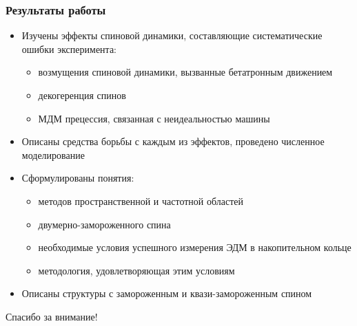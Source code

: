 \documentclass[14pt]{beamer}
\begin{document}
\begin{frame}
\frametitle{Результаты работы}
\begin{itemize}
  \item Изучены эффекты спиновой динамики, составляющие систематические ошибки эксперимента:
  \begin{itemize}
  	\item возмущения спиновой динамики, вызванные бетатронным движением
  	\item декогеренция спинов
  	\item МДМ прецессия, связанная с неидеальностью машины
  \end{itemize}
  \item Описаны средства борьбы с каждым из эффектов, проведено численное моделирование
\end{itemize}
\end{frame}
\begin{frame}
	\begin{itemize}
		  \item Сформулированы понятия:
		\begin{itemize}
			\item методов пространственной и частотной областей
			\item двумерно-замороженного спина
			\item необходимые условия успешного измерения ЭДМ в накопительном кольце
			\item методология, удовлетворяющая этим условиям
		\end{itemize}
		\item Описаны структуры с замороженным и квази-замороженным спином
	\end{itemize}
\end{frame}

\begin{frame}
\begin{center}
Спасибо за внимание!
\end{center}
\end{frame}
\end{document}
